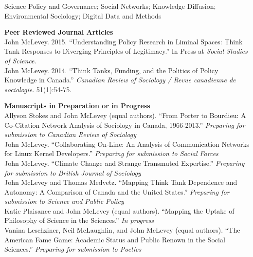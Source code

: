 \documentclass[9pt,usenames,dvipsnames]{article}
\begin{document}

\noindent Science Policy and Governance; Social Networks; Knowledge Diffusion; Environmental Sociology; Digital Data and Methods \\
 

\ind \textbf{Peer Reviewed Journal Articles} \\

\ind John McLevey. 2015. ``Understanding Policy Research in Liminal Spaces: Think Tank Responses to Diverging Principles of Legitimacy.'' In Press at \emph{Social Studies of Science}. \\

\ind John McLevey. 2014. ``Think Tanks, Funding, and the Politics of Policy Knowledge in Canada.'' \emph{Canadian Review of Sociology / Revue canadienne de sociologie}. 51(1):54-75.\\


\ind \textbf{Manuscripts in Preparation or in Progress} \\

\ind Allyson Stokes and John McLevey (equal authors). ``From Porter to Bourdieu: A Co-Citation Network Analysis of Sociology in Canada, 1966-2013.'' \emph{Preparing for submission to Canadian Review of Sociology} \\

\ind John McLevey. ``Collaborating On-Line: An Analysis of Communication Networks for Linux Kernel Developers.'' \emph{Preparing for submission to Social Forces} \\

\ind John McLevey. ``Climate Change and Strange Transmuted Expertise.'' \emph{Preparing for submission to British Journal of Sociology} \\

\ind John McLevey and Thomas Medvetz. ``Mapping Think Tank Dependence and Autonomy: A Comparison of Canada and the United States.'' \emph{Preparing for submission to Science and Public Policy}\\

\ind Katie Plaisance and John McLevey (equal authors). ``Mapping the Uptake of Philosophy of Science in the Sciences.'' \emph{In progress}\\

\ind Vanina Leschziner, Neil McLaughlin, and John McLevey (equal authors). ``The American Fame Game: Academic Status and Public Renown in the Social Sciences.'' \emph{Preparing for submission to Poetics} \\ 
\end{document}

